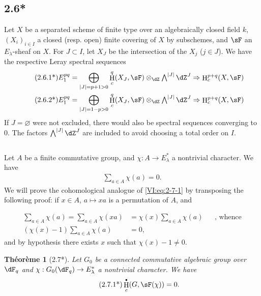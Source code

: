 \documentclass[oneside]{book}
\DeclareMathOperator{\h}{H}
\newcounter{char}
\theoremstyle{sga-source}
\theoremstyle{sga-source-dash}
\theoremstyle{sga-source-dotdash}
\theoremstyle{sga-source-number-note-dash}
\theoremstyle{sga-source-note-number-dotdash}
\theoremstyle{sga-source-example-dotdash}
\theoremstyle{sga-source-inline-number}
\theoremstyle{sga-source-bare-number}
\theoremstyle{sga-source}
\newtheorem*{theorem*}{Théorème}
\let\oldbullet\bullet
\renewcommand{\bullet}{\textnormal{\tiny$\oldbullet$}}
\newcommand{\PrintPage}[1]{}\newcommand{\MathPage}[1]{}\newcommand{\PrintCite}[2]{#1}\newcommand{\var}[3]{#1}
\begin{document}
\subsection*{2.6*}\label{VI:2-6*}

Let $X$ be a separated scheme of finite type over an algebraically closed field $k$, 
$(X_i)_{i\in I}$ a closed (resp. open) finite covering of $X$ by 
subschemes, and $\sF$ an $E_\lambda$-sheaf on $X$. For $J\subset I$, 
let $X_J$ be the intersection of the $X_j$ ($j\in J$). We have the respective 
Leray spectral sequences 
\begin{align*}\tag{2.6.1*}\label{VI:eq:2-6-1*}
  E_1^{p q} &= \bigoplus_{|J|=p+1>0} \h_c^q(X_J,\sF) \otimes_\dZ \textstyle\bigwedge^{|J|} \dZ^J \Rightarrow \h_c^{p+q}(X,\sF) \\ 
  \tag{2.6.2*}\label{VI:eq:2-6-2*}
  E_1^{p q} &= \bigoplus_{|J|=1-p>0} \h_c^q(X_J,\sF) \otimes_\dZ \textstyle\bigwedge^{|J|} \dZ^J \Rightarrow \h_c^{p+q}(X,\sF)
\end{align*}
If $J=\varnothing$ were not excluded, there would also be spectral 
sequences converging to $0$. The factors $\bigwedge^{|J|} \dZ^J$ are included 
to avoid choosing a total order on $I$. 





\subsection{}\label{VI:2-7}

Let $A$ be a finite commutative group, and $\chi:A \to E_\lambda^\ast$ a 
nontrivial character. We have 
\begin{align*}\tag{2.7.1}\label{VI:eq:2-7-1}
  \sum_{a\in A} \chi(a) = 0 \text{.}
\end{align*}
We will prove the cohomological analogue of \eqref{VI:eq:2-7-1} by transposing 
the following proof: if $x\in A$, $a\mapsto x a$ is a permutation of $A$, and 
\PrintPage{187}
\begin{align*}
  \sum_{a\in A}\chi(a) = \sum_{a\in A} \chi(x a) &= \chi(x) \sum_{a\in A} \chi(a) && \text{, whence} \\
  (\chi(x)-1)\sum_{a\in A}\chi(a) &= 0 \text{,}
\end{align*}
and by hypothesis there exists $x$ such that $\chi(x)-1\ne 0$. 





\begin{theorem*}[2.7*]\label{VI:2-7*}
Let $G_0$ be a connected commutative algebraic group over $\dF_q$ and 
$\chi:G_0(\dF_q) \to E_\lambda^\ast$ a nontrivial character. We have 
\begin{align*}\tag{2.7.1*}\label{VI:eq:2-7-1*}
  \h_c^\bullet(G,\sF(\chi)) = 0 \text{.}
\end{align*}
\end{theorem*}
\end{document}
